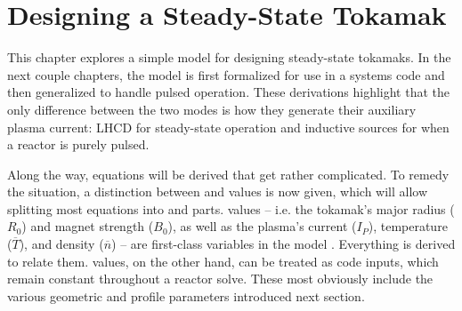%
%
%
%
%
%
%
%

\chapter{Designing a Steady-State Tokamak}

This chapter explores a simple model for designing steady-state tokamaks. In the next couple chapters, the model is first formalized for use in a systems code and then generalized to handle pulsed operation. These derivations highlight that the only difference between the two modes  is how they generate their auxiliary plasma current: LHCD for steady-state operation and inductive sources for when a reactor is purely pulsed.

Along the way, equations will be derived that get rather complicated. To remedy the situation, a distinction between  and  values is now given, which will allow splitting most equations into  and  parts.  values -- i.e. the tokamak's major radius ($R_0$) and magnet strength ($B_0$), as well as the plasma's current ($I_P$), temperature ($\overline T$), and density ($\overline n$) -- are first-class variables in the model . Everything is derived to relate them.  values, on the other hand, can be treated as code inputs, which remain constant throughout a reactor solve.  These most obviously include the various geometric and profile parameters introduced next section. 


